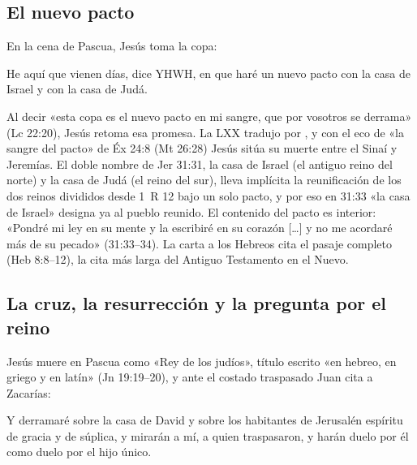 \subsection{El nuevo pacto}
En la cena de Pascua, Jesús toma la copa:

\begin{cita}He aquí que vienen días, dice YHWH, en que haré un nuevo pacto con la casa de Israel y con la casa de Judá.\end{cita}

Al decir «esta copa es el nuevo pacto en mi sangre, que por vosotros se derrama» (Lc 22:20), Jesús retoma esa promesa. La LXX tradujo  por , y con el eco de «la sangre del pacto» de Éx 24:8 (Mt 26:28) Jesús sitúa su muerte entre el Sinaí y Jeremías. El doble nombre de Jer 31:31, la casa de Israel (el antiguo reino del norte) y la casa de Judá (el reino del sur), lleva implícita la reunificación de los dos reinos divididos desde 1~R 12 bajo un solo pacto, y por eso en 31:33 «la casa de Israel» designa ya al pueblo reunido. El contenido del pacto es interior: «Pondré mi ley en su mente y la escribiré en su corazón [\ldots] y no me acordaré más de su pecado» (31:33--34). La carta a los Hebreos cita el pasaje completo (Heb 8:8--12), la cita más larga del Antiguo Testamento en el Nuevo.

\subsection{La cruz, la resurrección y la pregunta por el reino}
Jesús muere en Pascua como «Rey de los judíos», título escrito «en hebreo, en griego y en latín» (Jn 19:19--20), y ante el costado traspasado Juan cita a Zacarías:

\begin{cita}Y derramaré sobre la casa de David y sobre los habitantes de Jerusalén espíritu de gracia y de súplica, y mirarán a mí, a quien traspasaron, y harán duelo por él como duelo por el hijo único.\end{cita}

